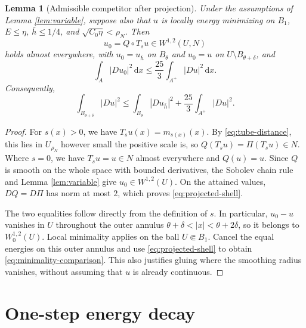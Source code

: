 \documentclass[11pt,a4paper]{article}
\numberwithin{equation}{section}
\newtheorem{lemma}[theorem]{Lemma}
\theoremstyle{definition}
\newcommand{\dd}{\,\mathrm d}
\newcommand{\dx}{\dd x}
\newcommand{\W}{W^{1,2}}
\newcommand{\Wo}{W^{1,2}_0}
\begin{document}
\begin{lemma}[Admissible competitor after projection]\label{lem:competitor}
Under the assumptions of Lemma \ref{lem:variable}, suppose also that $u$ is locally energy minimizing on $B_1$, $E\le\eta$, $\bar h\le1/4$, and $\sqrt{C_0\eta}<\rho_N$. Then
\[
u_0=Q\circ T_su\in\W(U,N)
\]
holds almost everywhere, with $u_0=u_{\bar h}$ on $B_\theta$ and $u_0=u$ on $U\setminus B_{\theta+\delta}$, and
\begin{equation}\label{eq:projected-shell}
\int_A|Du_0|^2\dx\le\frac{25}{3}\int_{A^+}|Du|^2\dx.
\end{equation}
Consequently,
\begin{equation}\label{eq:minimality-comparison}
\int_{B_{\theta+\delta}}|Du|^2
\le\int_{B_\theta}|Du_{\bar h}|^2+\frac{25}{3}\int_{A^+}|Du|^2.
\end{equation}
\end{lemma}
\begin{proof}
For $s(x)>0$, we have $T_su(x)=m_{s(x)}(x)$. By \eqref{eq:tube-distance}, this lies in $U_{\rho_N}$ however small the positive scale is, so $Q(T_su)=\Pi(T_su)\in N$. Where $s=0$, we have $T_su=u\in N$ almost everywhere and $Q(u)=u$. Since $Q$ is smooth on the whole space with bounded derivatives, the Sobolev chain rule and Lemma \ref{lem:variable} give $u_0\in\W(U)$. On the attained values, $DQ=D\Pi$ has norm at most $2$, which proves \eqref{eq:projected-shell}.

The two equalities follow directly from the definition of $s$. In particular, $u_0-u$ vanishes in $U$ throughout the outer annulus $\theta+\delta<|x|<\theta+2\delta$, so it belongs to $\Wo(U)$. Local minimality applies on the ball $U\Subset B_1$. Cancel the equal energies on this outer annulus and use \eqref{eq:projected-shell} to obtain \eqref{eq:minimality-comparison}. This also justifies gluing where the smoothing radius vanishes, without assuming that $u$ is already continuous.
\end{proof}

\section{One-step energy decay}\label{sec:decay}
\end{document}
